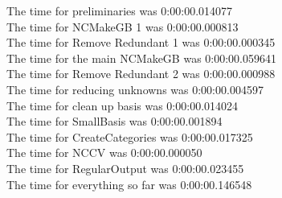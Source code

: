 \documentclass[rep10,leqno]{report}
\begin{document}
\noindent
The time for preliminaries was 0:00:00.014077\\
The time for NCMakeGB 1 was 0:00:00.000813\\
The time for Remove Redundant 1 was 0:00:00.000345\\
The time for the main NCMakeGB was 0:00:00.059641\\
The time for Remove Redundant 2 was 0:00:00.000988\\
The time for reducing unknowns was 0:00:00.004597\\
The time for clean up basis was 0:00:00.014024\\
The time for SmallBasis was 0:00:00.001894\\
The time for CreateCategories was 0:00:00.017325\\
The time for NCCV was 0:00:00.000050\\
The time for RegularOutput was 0:00:00.023455\\
The time for everything so far was 0:00:00.146548\\
\end{document}
